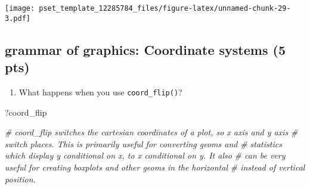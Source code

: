 \documentclass[
]{article}
\newenvironment{Shaded}{\begin{snugshade}}{\end{snugshade}}
\newcommand{\CommentTok}[1]{\textcolor[rgb]{0.56,0.35,0.01}{\textit{#1}}}
\newcommand{\NormalTok}[1]{#1}
\providecommand{\tightlist}{%
  \setlength{\itemsep}{0pt}\setlength{\parskip}{0pt}}
\begin{document}
\begin{enumerate}
  \texttt{[image: pset\_template\_12285784\_files/figure-latex/unnamed-chunk-29-3.pdf]}
\end{enumerate}

\hypertarget{grammar-of-graphics-coordinate-systems-5-pts}{%
\subsection{grammar of graphics: Coordinate systems (5
pts)}\label{grammar-of-graphics-coordinate-systems-5-pts}}

\begin{enumerate}
\def\labelenumi{\arabic{enumi}.}
\tightlist
\item
  What happens when you use \texttt{coord\_flip()}?
\end{enumerate}

\begin{Shaded}
\begin{Highlighting}[]
\NormalTok{?coord_flip}

\CommentTok{# coord_flip switches the cartesian coordinates of a plot, so x axis and y axis}
\CommentTok{# switch places. This is primarily useful for converting geoms and}
\CommentTok{# statistics which display y conditional on x, to x conditional on y. It also}
\CommentTok{# can be very useful for creating boxplots and other geoms in the horizontal}
\CommentTok{# instead of vertical position.}
\end{Highlighting}
\end{Shaded}
\end{document}

